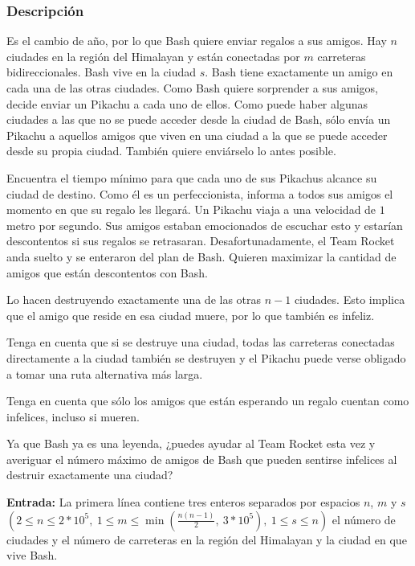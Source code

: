 \documentclass[12pt]{article}
\newcommand{\nl}{\vspace{0.3cm}}
\begin{document}
\subsubsection{Descripción}

Es el cambio de año, por lo que Bash quiere enviar regalos a sus amigos. Hay $n$ ciudades en la región del Himalayan y están conectadas por $m$ carreteras bidireccionales. Bash vive en la ciudad $s$. Bash tiene exactamente un amigo en cada una de las otras ciudades. Como Bash quiere sorprender a sus amigos, decide enviar un Pikachu a cada uno de ellos. Como puede haber algunas ciudades a las que no se puede acceder desde la ciudad de Bash, sólo envía un Pikachu a aquellos amigos que viven en una ciudad a la que se puede acceder desde su propia ciudad. También quiere enviárselo lo antes posible.

\nl

Encuentra el tiempo mínimo para que cada uno de sus Pikachus alcance su ciudad de destino. Como él es un perfeccionista, informa a todos sus amigos el momento en que su regalo les llegará. Un Pikachu viaja a una velocidad de $1$ metro por segundo. Sus amigos estaban emocionados de escuchar esto y estarían descontentos si sus regalos se retrasaran. Desafortunadamente, el Team Rocket anda suelto y se enteraron del plan de Bash. Quieren maximizar la cantidad de amigos que están descontentos con Bash.

\nl

Lo hacen destruyendo exactamente una de las otras $n - 1$ ciudades. Esto implica que el amigo que reside en esa ciudad muere, por lo que también es infeliz.

\nl

Tenga en cuenta que si se destruye una ciudad, todas las carreteras conectadas directamente a la ciudad también se destruyen y el Pikachu puede verse obligado a tomar una ruta alternativa más larga.

\nl

Tenga en cuenta que sólo los amigos que están esperando un regalo cuentan como infelices, incluso si mueren.

\nl

Ya que Bash ya es una leyenda, ¿puedes ayudar al Team Rocket esta vez y averiguar el número máximo de amigos de Bash que pueden sentirse infelices al destruir exactamente una ciudad?

\nl

\textbf{Entrada:} La primera línea contiene tres enteros separados por espacios $n$, $m$ y $s$ $ \left( 2 \leqslant n \leqslant 2 * 10^5,\ 1 \leqslant m \leqslant \min\left( \frac{n(n-1)}{2},\ 3 * 10^5 \right),\ 1 \leqslant s \leqslant n \right) $ el número de ciudades y el número de carreteras en la región del Himalayan y la ciudad en que vive Bash.
\end{document}
